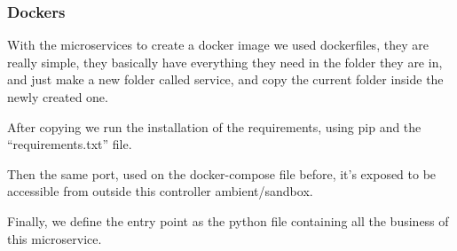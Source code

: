 \documentclass[oneside]{article}
\newcommand*\fpar{\hspace{1ex}}
\begin{document}
      \subsubsection{Dockers}
      \fpar With the microservices to create a docker image we used dockerfiles, they are really simple, they basically have everything they need in the folder they are in, and just make a new folder called service, and copy the current folder inside the newly created one.
      \par After copying we run the installation of the requirements, using pip and the “requirements.txt” file.
      \par Then the same port, used on the docker-compose file before, it's exposed to be accessible from outside this controller ambient/sandbox.
      \par Finally, we define the entry point as the python file containing all the business of this microservice.
\end{document}
